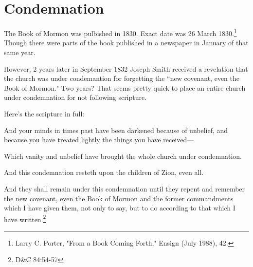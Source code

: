 \chapter{Condemnation}

The Book of Mormon was pulbished in 1830. Exact date was 26 March 1830.\footnote{
Larry C. Porter, "From a Book Coming Forth," Ensign (July 1988), 42.} Though there
were parts of the book published in a newspaper in January of that same year.

However, 2 years later in September 1832 Joseph Smith received a revelation that the
church was under condemantion for forgetting the ``new covenant, even the Book of
Mormon." Two years? That seems pretty quick to place an entire church under
condemnation for not following scripture.

Here's the scripture in full:

\begin{displayquote}
And your minds in times past have been darkened because of unbelief, and because you 
have treated lightly the things you have received—

Which vanity and unbelief have brought the whole church under condemnation.

And this condemnation resteth upon the children of Zion, even all.

And they shall remain under this condemnation until they repent and remember the new 
covenant, even the Book of Mormon and the former commandments which I have given 
them, not only to say, but to do according to that which I have written.\footnote{
D\&C 84:54-57
}
\end{displayquote}